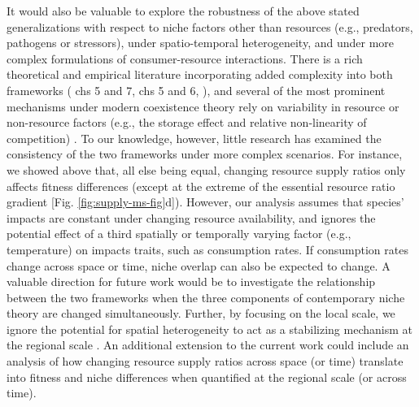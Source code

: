 It would also be valuable to explore the robustness of the above stated generalizations with respect to niche factors other than resources (e.g., predators, pathogens or stressors), under spatio-temporal heterogeneity, and under more complex formulations of consumer-resource interactions. There is a rich theoretical and empirical literature incorporating added complexity into both frameworks (\citealp{Grover1997} chs 5 and 7, \citealp{Chase2003} chs 5 and 6,  \citealp{Chesson2008b, Chesson2013ecosys}), and several of the most prominent mechanisms under modern coexistence theory rely on variability in resource or non-resource factors (e.g., the storage effect and relative non-linearity of competition) \citep{Chesson1994, Chesson2000c, Chesson2000}. To our knowledge, however, little research has examined the consistency of the two frameworks under more complex scenarios. For instance, we showed above that, all else being equal, changing resource supply ratios only affects fitness differences (except at the extreme of the essential resource ratio gradient [Fig. \ref{fig:supply-ms-fig}d]). However, our analysis assumes that species' impacts are constant under changing resource availability, and ignores the potential effect of a third spatially or temporally varying factor (e.g., temperature) on impacts traits, such as consumption rates. If consumption rates change across space or time, niche overlap can also be expected to change. A valuable direction for future work would be to investigate the relationship between the two frameworks when the three components of contemporary niche theory are changed simultaneously. Further, by focusing on the local scale, we ignore the potential for spatial heterogeneity to act as a stabilizing mechanism at the regional scale \citep{Adler2006, Sears2007, Angert2009}. An additional extension to the current work could include an analysis of how changing resource supply ratios across space (or time) translate into fitness and niche differences when quantified at the regional scale (or across time).
\par


